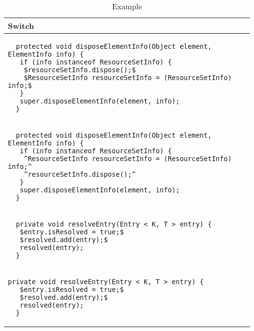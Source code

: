 \begin{table}[p]
\begin{tabular}{ | m{11cm} | }
  \hline
  Switch \\
  \hline
  \begin{lstlisting}
  protected void disposeElementInfo(Object element, ElementInfo info) {
   if (info instanceof ResourceSetInfo) {
    $resourceSetInfo.dispose();$
    $ResourceSetInfo resourceSetInfo = (ResourceSetInfo) info;$
   }
   super.disposeElementInfo(element, info);
  }
  \end{lstlisting} \\
  \begin{lstlisting}
  protected void disposeElementInfo(Object element, ElementInfo info) {
   if (info instanceof ResourceSetInfo) {
    ^ResourceSetInfo resourceSetInfo = (ResourceSetInfo) info;^
    ^resourceSetInfo.dispose();^
   }
   super.disposeElementInfo(element, info);
  }
  \end{lstlisting} \\
  \hline
  \hline
  \begin{lstlisting}
  private void resolveEntry(Entry < K, T > entry) {
   $entry.isResolved = true;$
   $resolved.add(entry);$
   resolved(entry);
  }
  \end{lstlisting} \\
  \begin{lstlisting}[style=table]
  private void resolveEntry(Entry < K, T > entry) {
   $entry.isResolved = true;$
   $resolved.add(entry);$
   resolved(entry);
  }
  \end{lstlisting} \\
  \hline
\end{tabular}
\caption{Example}
\label{switch_showcase_table}
\end{table}
